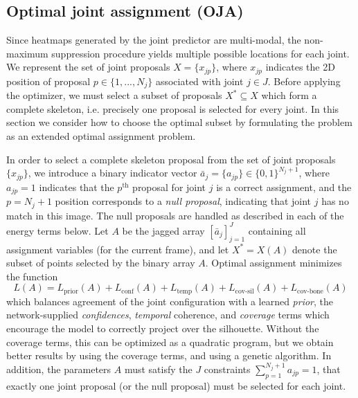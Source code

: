 \subsection{Optimal joint assignment (OJA)}
\label{sec:qp}
Since heatmaps generated by the joint predictor are multi-modal, the non-maximum suppression procedure yields multiple possible locations for each joint. We represent the set of joint proposals $X = \{x_{jp}\}$, where $x_{jp}$ indicates the 2D position of proposal $p \in \{1,...,N_j\}$ associated with joint $j \in J$.
Before applying the optimizer, we must select a subset of proposals $X^* \subseteq X$ which form a complete skeleton, i.e. precisely one proposal is selected for every joint. In this section we consider how to choose the optimal subset by formulating the problem as an extended optimal assignment problem.

\def\bvec#1{\bar{#1}}
\def\LL#1{L_{\text{#1}}}
In order to select a complete skeleton proposal from the set of joint proposals $\{x_{jp}\}$, we introduce a binary indicator vector $\bvec a_j = \{a_{jp}\} \in \{0, 1\}^{N_j+1}$, where $a_{jp} = 1$ indicates that the $p^\text{th}$ proposal for joint $j$ is a correct assignment, and the $p = N_j+1$ position corresponds to a {\em null proposal}, indicating that joint $j$ has no match in this image.
The null proposals are handled as described in each of the energy terms below.
Let $A$ be the jagged array $[\bvec a_j]_{j=1}^J$ containing all assignment variables (for the current frame), and let $X^* = X(A)$ denote the subset of points selected by the binary array $A$.   
Optimal assignment minimizes the function
\begin{equation}
L(A) = \LL{prior}(A) + \LL{conf}(A) + \LL{temp}(A) + \LL{cov-sil}(A) + \LL{cov-bone}(A)
\end{equation}
which balances agreement of the joint configuration with a learned {\em prior}, the network-supplied {\em confidences}, {\em temporal} coherence, and {\em coverage} terms which encourage the  model to correctly project over the silhouette.   Without the coverage terms, this can be optimized as a quadratic program, but we obtain better results by using the coverage terms, and using a genetic algorithm.  In addition, the parameters $A$ must satisfy the $J$ constraints $\sum_{p=1}^{N_j+1} a_{jp} = 1$, that exactly one joint proposal (or the null proposal) must be selected for each joint.

\def\lterm#1{\subsubsection{$\LL{#1}$:}}


